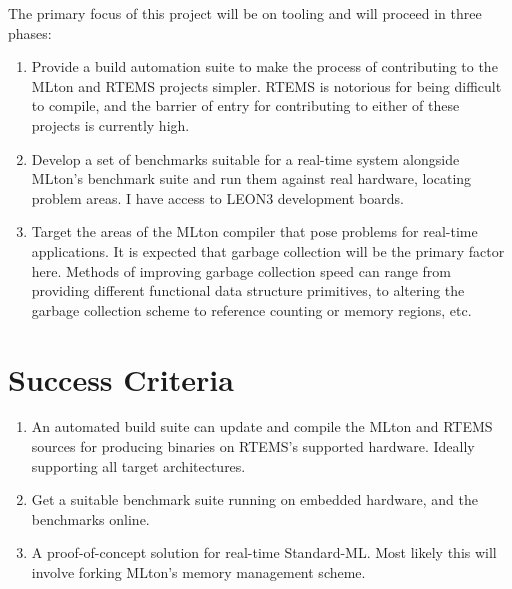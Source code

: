 \documentclass[12pt]{article}
\begin{document}
The primary focus of this project will be on tooling and will proceed in three phases:
\begin{enumerate}
\item Provide a build automation suite to make the process of contributing to the MLton and RTEMS projects simpler. RTEMS is notorious for being difficult to compile, and the barrier of entry for contributing to either of these projects is currently high.
\item Develop a set of benchmarks suitable for a real-time system alongside MLton's benchmark suite and run them against real hardware, locating problem areas. I have access to LEON3 development boards.
\item Target the areas of the MLton compiler that pose problems for real-time applications. It is expected that garbage collection will be the primary factor here. Methods of improving garbage collection speed can range from providing different functional data structure primitives, to altering the garbage collection scheme to reference counting or memory regions, etc.
\end{enumerate}

\section{Success Criteria}
\begin{enumerate}
\item An automated build suite can update and compile the MLton and RTEMS sources for producing binaries on RTEMS's supported hardware. Ideally supporting all target architectures.
\item Get a suitable benchmark suite running on embedded hardware, and the benchmarks online.
\item A proof-of-concept solution for real-time Standard-ML. Most likely this will involve forking MLton's memory management scheme.
\end{enumerate}
\end{document}
